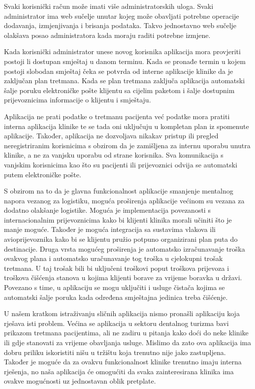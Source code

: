 		
		Svaki korisnički račun može imati više administratorskih uloga. Svaki administrator ima web sučelje unutar kojeg može obavljati potrebne operacije dodavanja, izmjenjivanja i brisanja podataka. Takvo jednostavno web sučelje olakšava posao administratora kada moraju raditi potrebne izmjene. 
		
		Kada korisnički administrator unese novog korisnika aplikacija mora provjeriti postoji li dostupan smještaj u danom terminu. Kada se pronađe termin u kojem postoji slobodan smještaj čeka se potvrda od interne aplikacije klinike da je zaključan plan tretmana. Kada se plan tretmana zaključa aplikacija automatski šalje poruku elektroničke pošte klijentu sa cijelim paketom i šalje dostupnim prijevoznicima informacije o klijentu i smještaju.
		
		Aplikacija ne prati podatke o tretmanu pacijenta već podatke mora pratiti interna aplikacija klinike te se tada oni uključuju u kompletan plan iz spomenute aplikacije. Također,  aplikacija ne dozvoljava nikakav pristup ili pregled neregistriranim korisnicima s obzirom da je zamišljena za internu uporabu unutra klinike, a ne za vanjsku uporabu od strane korisnika. Sva komunikacija s vanjskim korisnicima kao što su pacijenti ili prijevoznici odvija se automatski putem elektroničke pošte.
		
		S obzirom na to da je glavna funkcionalnost aplikacije smanjenje mentalnog napora vezanog za logistiku, moguća proširenja aplikacije većinom su vezana za dodatno olakšanje logistike. Moguća je implementacija povezanosti s internacionalnim prijevoznicima kako bi klijenti klinika morali učiniti što je manje moguće. Također je moguća integracija sa sustavima vlakova ili avioprijevoznika kako bi se klijentu pružio potpuno organizirani plan puta do destinacije. Druga vrsta mogućeg proširenja je automatsko izračunavanje troška ovakvog plana i automatsko uračunavanje tog troška u cjelokupni trošak tretmana. U taj trošak bili bi uključeni troškovi poput troškova prijevoza i troškova čišćenja stanova u kojima klijenti borave za vrijeme boravka u državi. Povezano s time, u aplikaciju se mogu uključiti i usluge čistača kojima se automatski šalje poruka kada određena smještajna jedinica treba čišćenje.
		
		\eject
		
		U našem kratkom istraživanju sličnih aplikacija nismo pronašli aplikaciju koja rješava isti problem. Većina se aplikacija u sektoru dentalnog turizma bavi prikazom tretmana pacijentima, ali ne zadiru u pitanja kako doći do neke klinike ili gdje stanovati za vrijeme obavljanja usluge. Mislimo da zato ova aplikacija ima dobru priliku iskoristiti nišu u tržištu koja trenutno nije jako zastupljena. Također je moguće da za ovakvu funkcionalnost klinike trenutno imaju interna rješenja, no naša aplikacija će omogućiti da svaka zainteresirana klinika ima ovakve mogućnosti uz jednostavan oblik pretplate.
	